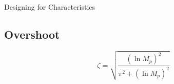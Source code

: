 \documentclass{../templates/topic}
\begin{document}
\begin{section}{Designing for Characteristics}
	\subsection{Overshoot}
		\begin{equation*}
			\zeta = \sqrt{\frac{(\ln{M_p})^2}{\pi^2+(\ln{M_p})^2}}
		\end{equation*}
	
\end{section}
\end{document}
